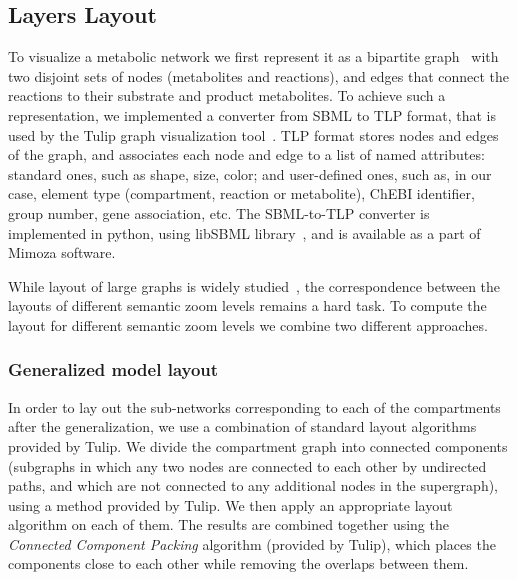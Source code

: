 \documentclass{bmcart}
\begin{document}
\subsection*{Layers Layout}
To visualize a metabolic network we first represent it as a bipartite graph~\cite{Diestel2012} with two disjoint sets of nodes (metabolites and reactions), and edges that connect the reactions to their substrate and product metabolites. To achieve such a representation, we implemented a converter from SBML to TLP format, that is used by the Tulip graph visualization tool~\cite{Auber04}. TLP format stores nodes and edges of the graph, and associates each node and edge to a list of named attributes: standard ones, such as shape, size, color; and user-defined ones, such as, in our case, element type (compartment, reaction or metabolite), ChEBI identifier, group number, gene association, etc. The SBML-to-TLP converter is implemented in python, using libSBML library~\cite{Bornstein2008}, and is available as a part of Mimoza software. 

While layout of large graphs is widely studied~\cite{Unwin2006}, the correspondence between the layouts of different semantic zoom levels remains a hard task. To compute the layout for different semantic zoom levels we combine two different approaches.

\subsubsection*{Generalized model layout}
In order to lay out the sub-networks corresponding to each of the compartments after the generalization, we use a combination of standard layout algorithms provided by Tulip. We divide the compartment graph into connected components (subgraphs in which any two nodes are connected to each other by undirected paths, and which are not connected to any additional nodes in the supergraph), using a method provided by Tulip. We then apply an appropriate layout algorithm on each of them. The results are combined together using the \emph{Connected Component Packing} algorithm (provided by Tulip), which places the components close to each other while removing the overlaps between them.
\end{document}
